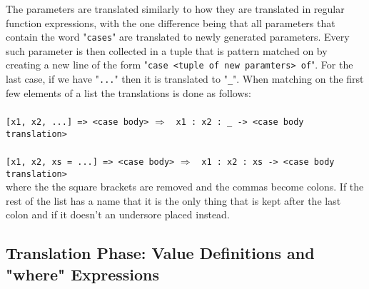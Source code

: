 \documentclass{article}
\def\lra{$\Longrightarrow$\ }
\begin{document}
\begin{itemize}
The parameters are translated similarly to how they are translated in regular
function expressions, with the one difference being that all parameters that
contain the word "\texttt{cases}" are translated to newly generated parameters.
Every such parameter is then collected in a tuple that is pattern matched on by
creating a new line of the form "\verb|case <tuple of new paramters> of|". For
the last case, if we have "\verb|...|" then it is translated to "\verb|_|".
When matching on the first few elements of a list the translations is done as
follows:
\\\\
\verb|[x1, x2, ...] => <case body>|
\lra
\verb|x1 : x2 : _ -> <case body translation>|
\\\\
\verb|[x1, x2, xs = ...] => <case body>|
\lra
\verb|x1 : x2 : xs -> <case body translation>|
\\

where the the square brackets are removed and the commas become colons.
If the rest of the list has a name that it is the only thing that is kept
after the last colon and if it doesn't an undersore placed instead.
\end{itemize}

\newpage
\subsection{Translation Phase: Value Definitions and "where" Expressions}
\label{subsec:tranvalwhere}
\end{document}
